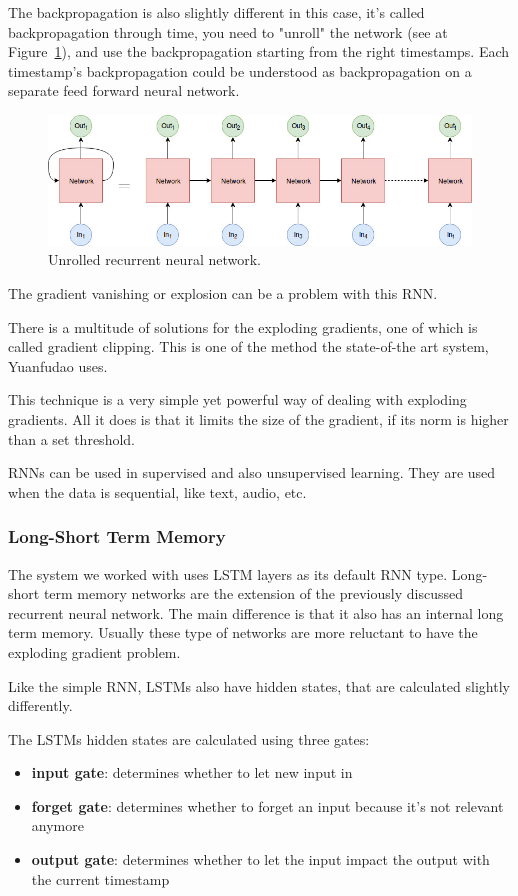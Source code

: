 The backpropagation is also slightly different in this case, it's called backpropagation through time, you need to "unroll" the network (see at Figure~\ref{fig:unrolled}), and use the backpropagation starting from the right timestamps. Each timestamp's backpropagation could be understood as backpropagation on a separate feed forward neural network. 
\begin{figure}[!htb]
	\centering
	\includegraphics[scale=0.5]{figures/unrolled.jpg}
	\caption{Unrolled recurrent neural network.}
	\label{fig:unrolled}
\end{figure}

The gradient vanishing or explosion can be a problem with this RNN.

There is a multitude of solutions for the exploding gradients, one of which is called gradient clipping. This is one of the method the state-of-the art system, Yuanfudao uses.

This technique is a very simple yet powerful way of dealing with exploding gradients. All it does is that it limits the size of the gradient, if its norm is higher than a set threshold.

RNNs can be used in supervised and also unsupervised learning. They are used when the data is sequential, like text, audio, etc.

\subsubsection{Long-Short Term Memory}
The system we worked with uses LSTM layers as its default RNN type.
Long-short term memory networks are the extension of the previously discussed recurrent neural network. The main difference is that it also has an internal long term memory. Usually these type of networks are more reluctant to have the exploding gradient problem.

Like the simple RNN, LSTMs also have hidden states, that are calculated slightly differently.
\\

\begin{minipage}{\textwidth}
	The LSTMs hidden states are calculated using three gates:
	\begin{itemize}
		\item \textbf{input gate}: determines whether to let new input in
		\item \textbf{forget gate}: determines whether to forget an input because it's not relevant anymore
		\item \textbf{output gate}: determines whether to let the input impact the output with the current timestamp
	\end{itemize}
\end{minipage}

